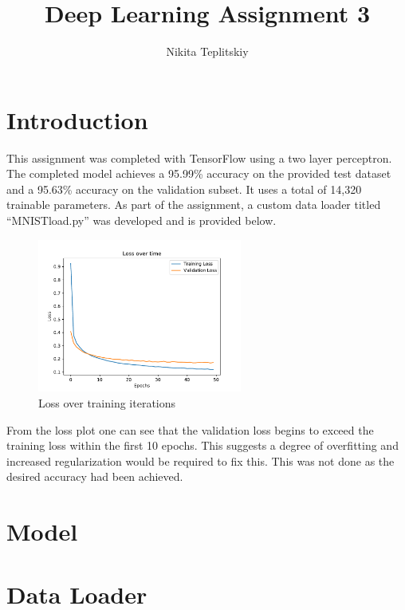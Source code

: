 \documentclass[]{article}
\title{Deep Learning Assignment 3}
\author{Nikita Teplitskiy}
\begin{document}
\maketitle
\section{Introduction}
This assignment was completed with TensorFlow using a two layer perceptron. The completed model achieves a 95.99\% accuracy on the provided test dataset and a 95.63\% accuracy on the validation subset. It uses a total of 14,320 trainable parameters. As part of the assignment, a custom data loader titled ``MNISTload.py'' was developed and is provided below.

\begin{figure}[H]
    \centering
    \includegraphics[width=0.6\textwidth]{loss.pdf}
    \caption{Loss over training iterations}
\end{figure}

\noindent
From the loss plot one can see that the validation loss begins to exceed the training loss within the first 10 epochs. This suggests a degree of overfitting and increased regularization would be required to fix this. This was not done as the desired accuracy had been achieved. 

\newpage
\onecolumn
%

\newpage
\section{Model}


\newpage
\section{Data Loader}

\end{document}

